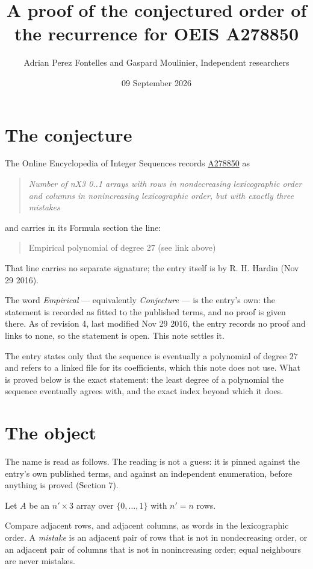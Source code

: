 \documentclass[11pt]{article}
\title{A proof of the conjectured order of the recurrence for OEIS A278850}
\author{Adrian Perez Fontelles and Gaspard Moulinier, Independent researchers}
\date{09 September 2026}
\theoremstyle{definition}
\begin{document}
\maketitle
\section{The conjecture}

The Online Encyclopedia of Integer Sequences records \href{https://oeis.org/A278850}{A278850} as

\begin{quote}\itshape Number of nX3 0..1 arrays with rows in nondecreasing lexicographic order and columns in nonincreasing lexicographic order, but with exactly three mistakes\end{quote}

and carries in its Formula section the line:

\begin{quote}\ttfamily Empirical polynomial of degree 27 (see link above)\end{quote}

That line carries no separate signature; the entry itself is by R. H. Hardin (Nov 29 2016).

The word {\itshape Empirical} --- equivalently {\itshape Conjecture} --- is the entry's own: the statement is recorded as fitted to the published terms, and no proof is given there. As of revision 4, last modified Nov 29 2016, the entry records no proof and links to none, so the statement is open. This note settles it.

The entry states only that the sequence is eventually a polynomial of degree $27$ and refers to a linked file for its coefficients, which this note does not use. What is proved below is the exact statement: the least degree of a polynomial the sequence eventually agrees with, and the exact index beyond which it does.

\section{The object}

The name is read as follows. The reading is not a guess: it is pinned against the entry's own published terms, and against an independent enumeration, before anything is proved (Section 7).

Let $A$ be an $n' \times 3$ array over $\{0,\dots,1\}$ with $n' = n$ rows.

Compare adjacent rows, and adjacent columns, as words in the lexicographic order. A {\itshape mistake} is an adjacent pair of rows that is not in nondecreasing order, or an adjacent pair of columns that is not in nonincreasing order; equal neighbours are never mistakes.
\end{document}
